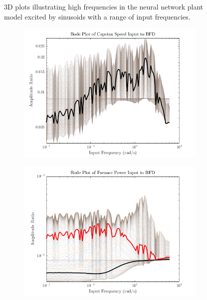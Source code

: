 \begin{figure}[hp]
    \caption{3D plots illustrating high frequencies in the neural network plant model excited by sinusoids with a range of input frequencies.}
    \label{fig:bode_3d}
\end{figure}

\begin{figure}[ht]
    \centering
    \begin{subfigure}[b]{0.49\textwidth}
        \centering
        \includegraphics[width=\textwidth]{figures/bode_profile1.png}
    \end{subfigure}
    \hfill
    \begin{subfigure}[b]{0.49\textwidth}
        \centering
        \includegraphics[width=\textwidth]{figures/bode_profile2.png}
    \end{subfigure}
    

\end{figure}
